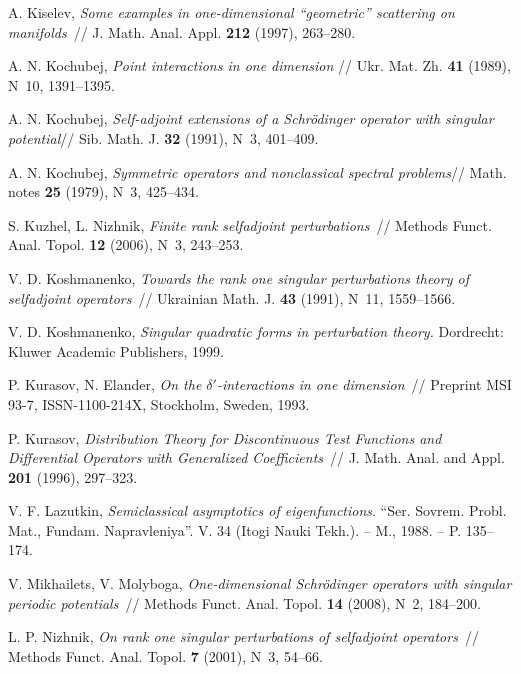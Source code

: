 \documentclass[11pt,english]{amsart}
\begin{document}
\begin{thebibliography}{99}
A. Kiselev, \textit{Some examples in one-dimensional ``geometric'' scattering on
manifolds}~// J. Math. Anal. Appl. \textbf{212} (1997), 263--280.

A. N. Kochubej, \textit{Point interactions in one dimension} // Ukr. Mat. Zh.  \textbf{41} (1989), N~10,
1391--1395.

A. N. Kochubej, \textit{Self-adjoint extensions of a Schr\"odinger operator with singular potential}// Sib. Math. J. \textbf{32} (1991), N~3, 401--409.

A. N. Kochubej, \textit{Symmetric operators and nonclassical spectral problems}// Math. notes \textbf{25} (1979),
N~3, 425--434.

S. Kuzhel, L. Nizhnik, \textit{Finite rank selfadjoint perturbations}~// Methods Funct.
Anal. Topol. \textbf{12} (2006), N~3, 243--253.

 V. D. Koshmanenko, \textit{Towards the rank one
singular perturbations theory of selfadjoint operators}~// Ukrainian Math. J. \textbf{43}
(1991), N~11, 1559--1566.

V. D. Koshmanenko, \textit{Singular quadratic forms in perturbation theory.} Dordrecht: Kluwer
    Academic Publishers, 1999.

 P. Kurasov,  N. Elander, \textit{On the $\delta'$-interactions in one dimension}~//
Preprint MSI 93-7, ISSN-1100-214X, Stockholm, Sweden, 1993.

 P. Kurasov, \textit{Distribution Theory for Discontinuous Test
Functions and Differential Operators with Generalized Coefficients}~// J. Math. Anal. and
Appl. \textbf{201} (1996), 297--323.

V. F. Lazutkin, {\it Semiclassical asymptotics of eigenfunctions}.
 ``Ser. Sovrem. Probl. Mat., Fundam. Napravleniya''. V. 34 (Itogi Nauki Tekh.). -- M., 1988. -- P. 135--174.

V. Mikhailets, V. Molyboga, \textit{One-dimensional Schr\"odinger operators with singular
periodic potentials}~// Methods Funct. Anal. Topol. \textbf{14} (2008), N~2, 184--200.

L. P. Nizhnik, \textit{On rank one singular perturbations of selfadjoint operators}~//
Methods Funct. Anal. Topol. \textbf{7} (2001), N~3, 54--66.


\end{thebibliography}
\end{document}
